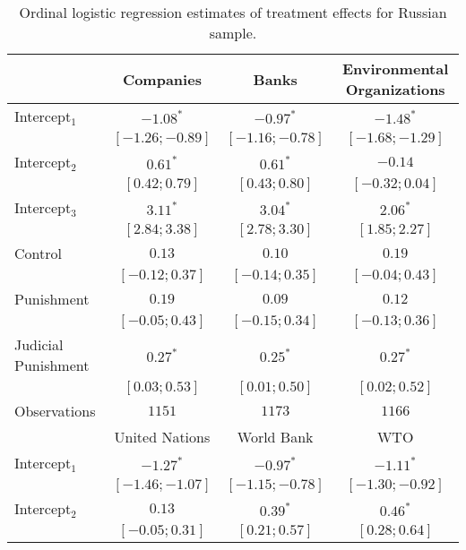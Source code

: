 \begin{table}[h]
\begin{center}
\caption{Ordinal logistic regression estimates of treatment effects for Russian sample.}
\begin{threeparttable}
\begin{tabular}{l c c c}
\hline
 & Companies & Banks & Environmental
Organizations \\
\hline
Intercept$_1$       & $-1.08^{*}$       & $-0.97^{*}$       & $-1.48^{*}$       \\
                    & $ [-1.26; -0.89]$ & $ [-1.16; -0.78]$ & $ [-1.68; -1.29]$ \\
Intercept$_2$       & $0.61^{*}$        & $0.61^{*}$        & $-0.14$           \\
                    & $ [ 0.42;  0.79]$ & $ [ 0.43;  0.80]$ & $ [-0.32;  0.04]$ \\
Intercept$_3$       & $3.11^{*}$        & $3.04^{*}$        & $2.06^{*}$        \\
                    & $ [ 2.84;  3.38]$ & $ [ 2.78;  3.30]$ & $ [ 1.85;  2.27]$ \\
Control             & $0.13$            & $0.10$            & $0.19$            \\
                    & $ [-0.12;  0.37]$ & $ [-0.14;  0.35]$ & $ [-0.04;  0.43]$ \\
Punishment          & $0.19$            & $0.09$            & $0.12$            \\
                    & $ [-0.05;  0.43]$ & $ [-0.15;  0.34]$ & $ [-0.13;  0.36]$ \\
Judicial Punishment & $0.27^{*}$        & $0.25^{*}$        & $0.27^{*}$        \\
                    & $ [ 0.03;  0.53]$ & $ [ 0.01;  0.50]$ & $ [ 0.02;  0.52]$ \\
\hline
Observations        & $1151$            & $1173$            & $1166$            \\
\hline
 & United Nations & World Bank & WTO \\
\hline
Intercept$_1$       & $-1.27^{*}$       & $-0.97^{*}$       & $-1.11^{*}$       \\
                    & $ [-1.46; -1.07]$ & $ [-1.15; -0.78]$ & $ [-1.30; -0.92]$ \\
Intercept$_2$       & $0.13$            & $0.39^{*}$        & $0.46^{*}$        \\
                    & $ [-0.05;  0.31]$ & $ [ 0.21;  0.57]$ & $ [ 0.28;  0.64]$ \\

\end{tabular}
\end{threeparttable}
\end{center}
\end{table}
